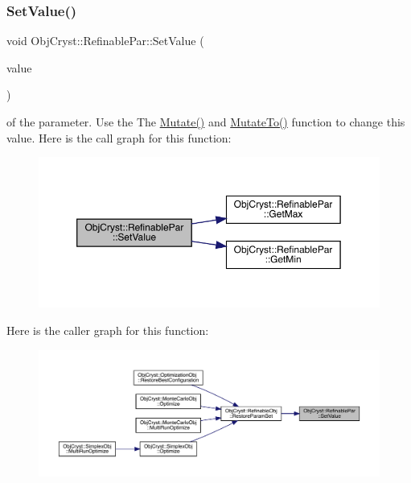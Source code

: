 \subsubsection{\texorpdfstring{SetValue()}{SetValue()}}
{\footnotesize\ttfamily void Obj\+Cryst\+::\+Refinable\+Par\+::\+Set\+Value (\begin{DoxyParamCaption}\item[{const R\+E\+AL}]{value }\end{DoxyParamCaption})}

of the parameter. Use the The \mbox{\hyperlink{class_obj_cryst_1_1_refinable_par_abd6a06bbb5eb59d80515ebdad2612da8}{Mutate()}} and \mbox{\hyperlink{class_obj_cryst_1_1_refinable_par_a696f87a0a129cfd270144532d664d093}{Mutate\+To()}} function to change this value. Here is the call graph for this function\+:
\nopagebreak
\begin{figure}[H]
\begin{center}
\leavevmode
\includegraphics[width=350pt]{class_obj_cryst_1_1_refinable_par_a55a87d842fc046b2f4b3c03c92e53052_cgraph}
\end{center}
\end{figure}
Here is the caller graph for this function\+:
\nopagebreak
\begin{figure}[H]
\begin{center}
\leavevmode
\includegraphics[width=350pt]{class_obj_cryst_1_1_refinable_par_a55a87d842fc046b2f4b3c03c92e53052_icgraph}
\end{center}
\end{figure}
\mbox{\label{class_obj_cryst_1_1_refinable_par_af6fcabe9e97e0aabacef7a9bee5d1106}} 
